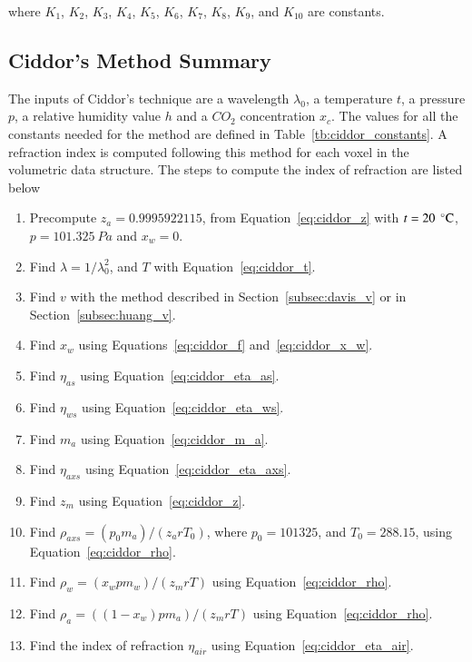 where $K_1$, $K_2$, $K_3$, $K_4$, $K_5$, $K_6$, $K_7$, $K_8$, $K_9$, and $K_{10}$ are constants.

\subsection{Ciddor's Method Summary}

The inputs of Ciddor's technique are a wavelength $\lambda_0$, a temperature $t$, a pressure $p$, a relative humidity value $h$ and a $CO_2$ concentration $x_c$.
The values for all the constants needed for the method are defined in Table~\ref{tb:ciddor_constants}.
A refraction index is computed following this method for each voxel in the volumetric data structure.
The steps to compute the index of refraction are listed below

\begin{enumerate}
\item Precompute $z_a = 0.9995922115$, from Equation~\ref{eq:ciddor_z} with $t = 20~\,^{\circ}{\rm C}$, $p = 101.325~Pa$ and $x_w=0$.
\item Find $\lambda = 1 / \lambda_0^2$, and $T$ with Equation~\ref{eq:ciddor_t}.
\item Find $v$ with the method described in Section~\ref{subsec:davis_v} or in Section~\ref{subsec:huang_v}.
\item Find $x_w$ using Equations~\ref{eq:ciddor_f} and~\ref{eq:ciddor_x_w}.
\item Find $\eta_{as}$ using Equation~\ref{eq:ciddor_eta_as}.
\item Find $\eta_{ws}$ using Equation~\ref{eq:ciddor_eta_ws}.
\item Find $m_a$ using Equation~\ref{eq:ciddor_m_a}.
\item Find $\eta_{axs}$ using Equation~\ref{eq:ciddor_eta_axs}.
\item Find $z_m$ using Equation~\ref{eq:ciddor_z}.
\item Find $\rho_{axs} = (p_0 m_a)/(z_a r T_0)$, where $p_0 = 101325$, and $T_0 = 288.15$, using Equation~\ref{eq:ciddor_rho}.
\item Find $\rho_{w} = (x_w p m_w)/(z_m r T)$ using Equation~\ref{eq:ciddor_rho}.
\item Find $\rho_{a} = ((1 - x_w) p m_a)/(z_m r T)$ using Equation~\ref{eq:ciddor_rho}.
\item Find the index of refraction $\eta_{air}$ using Equation~\ref{eq:ciddor_eta_air}.
\end{enumerate}


